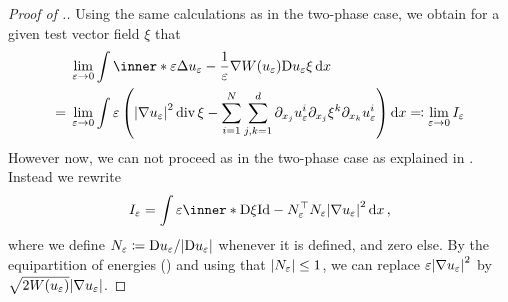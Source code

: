 \begin{proof}[Proof of .]
	Using the same calculations as in the two-phase case, we obtain for a given 
	test vector field $ \xi $ that
	\begin{align*}
		& \lim_{ \varepsilon \to 0 }
		\int
		\inner*{
			\varepsilon \Delta u_{ \varepsilon }
			-
			\frac{ 1 }{ \varepsilon } \nabla W ( u_{ \varepsilon } )
		}
		{
			\diff{ u_{ \varepsilon } } \xi
		}
		\dd{ x }
		\\
		={} &
		\lim_{ \varepsilon \to 0 }
		\int
		\varepsilon
		\left(
		\abs{ \nabla u_{ \varepsilon } }^{ 2 }
		\divg \xi 
		-
		\sum_{ i = 1 }^{ N }
		\sum_{ j, k = 1 }^{ d }
		\partial_{ x_{ j } } u_{ \varepsilon }^{ i }
		\partial_{ x_{ j } } \xi^{ k }
		\partial_{ x_{ k } } u_{ \varepsilon }^{ i }
		\right)
		\dd{ x } 
		\eqqcolon 
		\lim_{ \varepsilon \to 0 } I_{ \varepsilon }
	\end{align*}
	However now, we can not proceed as in the two-phase case as explained in 
	. 
	Instead we rewrite
	\begin{equation}
		\label{key_equality_for_ptw_estimate}
		I_{ \varepsilon }
		=
		\int
		\varepsilon
		\inner*{
			\diff \xi 
		}
		{
			\mathrm{Id} - N_{ \varepsilon }^{ \top } N_{ \varepsilon }
		}
		\abs{ \nabla u_{ \varepsilon } }^{ 2 }
		\dd{ x },
	\end{equation}
	where we define $ N_{ \varepsilon } \coloneqq \mathrm{D} u_{ \varepsilon } / 
	\abs{ \mathrm{D} u_{ \varepsilon } } $ whenever it is defined, and zero else. 
	By the equipartition of energies 
	() and using that 
	$ \abs{N_{ \varepsilon } } \leq 1 $, we can replace $ \varepsilon \abs{ 
	\nabla u_{ 
	\varepsilon } }^{ 2 } $ by $ \sqrt{ 2 W ( u_{ \varepsilon } ) } \abs{ 
	\nabla u_{ \varepsilon  } } $. 
	

\end{proof}
